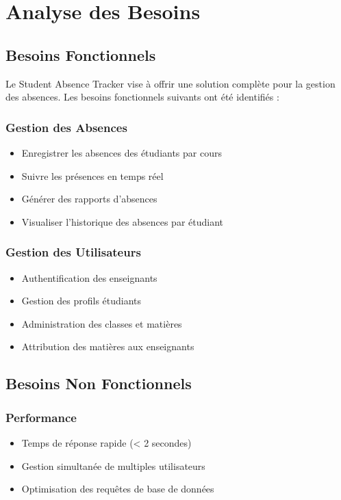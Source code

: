 \section{Analyse des Besoins}
\label{sec:analyse_des_besoins}

\subsection{Besoins Fonctionnels}
Le Student Absence Tracker vise à offrir une solution complète pour la gestion des absences. Les besoins fonctionnels suivants ont été identifiés :

\subsubsection{Gestion des Absences}
\begin{itemize}
    \item Enregistrer les absences des étudiants par cours
    \item Suivre les présences en temps réel
    \item Générer des rapports d'absences
    \item Visualiser l'historique des absences par étudiant
\end{itemize}

\subsubsection{Gestion des Utilisateurs}
\begin{itemize}
    \item Authentification des enseignants
    \item Gestion des profils étudiants
    \item Administration des classes et matières
    \item Attribution des matières aux enseignants
\end{itemize}

\subsection{Besoins Non Fonctionnels}

\subsubsection{Performance}
\begin{itemize}
    \item Temps de réponse rapide (< 2 secondes)
    \item Gestion simultanée de multiples utilisateurs
    \item Optimisation des requêtes de base de données
\end{itemize}

